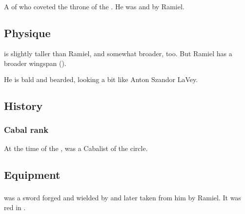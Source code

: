 \section{\Dasteron}
\index{\Dasteron}
A \ketheran{} \resphan{} of \Mystraacht{} who coveted the throne of the . 
He was  and  by Ramiel. 









\subsection{Physique}
\Dasteron{} is slightly taller than Ramiel, and somewhat broader, too. 
But Ramiel has a broader wingspan (). 

He is bald and bearded, looking a bit like Anton Szandor LaVey. 









\subsection{History}





\subsubsection{Cabal rank}
At the time of the \thirdbanewar, \Dasteron was a Cabalist of the \dasteroncircle circle. 









\subsection{Equipment}





\subsubsection{\Scaleron}
\Scaleron{} was a  sword forged and wielded by \Dasteron{} and later taken from him by Ramiel. 
It was red in \colour. 

